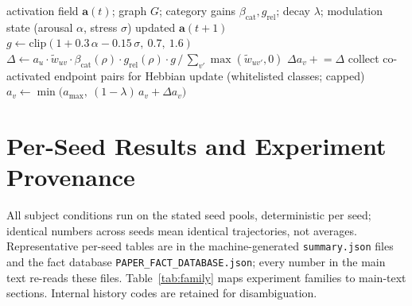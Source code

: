 \documentclass[10pt,a4paper]{article}
\begin{document}
\begin{algorithm}[t]
\caption{Spreading-activation step with modulation and suppression}\label{alg:spread}
\begin{algorithmic}[1]
\Require activation field $\mathbf{a}(t)$; graph $G$; category gains $\beta_{\mathrm{cat}}, g_{\mathrm{rel}}$; decay $\lambda$; modulation state (arousal $\alpha$, stress $\sigma$)
\Ensure updated $\mathbf{a}(t{+}1)$
\State $g \gets \mathrm{clip}(1 + 0.3\,\alpha - 0.15\,\sigma,\ 0.7,\ 1.6)$
    \State $\Delta \gets a_u \cdot \tilde w_{uv} \cdot \beta_{\mathrm{cat}}(\rho) \cdot g_{\mathrm{rel}}(\rho) \cdot g \,/\, \sum_{v'} \max(\tilde w_{uv'},0)$
    \State $\Delta a_v \mathrel{+}= \Delta$ 
  \EndFor
  \State collect co-activated endpoint pairs for Hebbian update (whitelisted classes; capped)
\EndFor
{}
  \State $a_v \gets \min\big(a_{\max},\ (1-\lambda)\,a_v + \Delta a_v\big)$
\EndFor
\end{algorithmic}
\end{algorithm}




\appendix
\section{Per-Seed Results and Experiment Provenance}
\label{app:seeds}
All subject conditions run on the stated seed pools, deterministic per seed; identical numbers across seeds mean identical trajectories, not averages. Representative per-seed tables are in the machine-generated \texttt{summary.json} files and the fact database \texttt{PAPER\_FACT\_DATABASE.json}; every number in the main text re-reads these files. Table~\ref{tab:family} maps experiment families to main-text sections. Internal history codes are retained for disambiguation.
\end{document}
